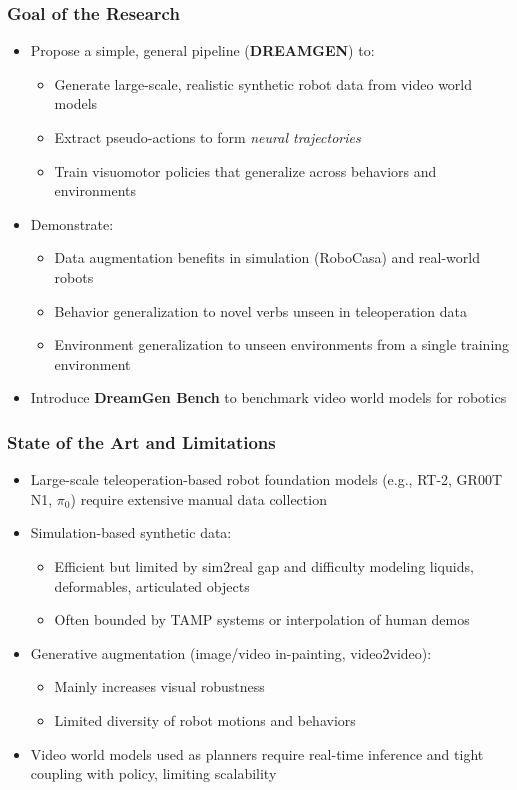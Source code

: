 \documentclass{beamer}
\begin{document}
\begin{frame}
  \frametitle{Goal of the Research}
  \small
  \begin{itemize}
    \item Propose a simple, general pipeline (\textbf{DREAMGEN}) to:
      \begin{itemize}
        \item Generate large-scale, realistic synthetic robot data from video world models
        \item Extract pseudo-actions to form \emph{neural trajectories}
        \item Train visuomotor policies that generalize across behaviors and environments
      \end{itemize}
    \item Demonstrate:
      \begin{itemize}
        \item Data augmentation benefits in simulation (RoboCasa) and real-world robots
        \item Behavior generalization to novel verbs unseen in teleoperation data
        \item Environment generalization to unseen environments from a single training environment
      \end{itemize}
    \item Introduce \textbf{DreamGen Bench} to benchmark video world models for robotics
  \end{itemize}
\end{frame}

\begin{frame}
  \frametitle{State of the Art and Limitations}
  \small
  \begin{itemize}
    \item Large-scale teleoperation-based robot foundation models (e.g., RT-2, GR00T N1, $\pi_0$) require extensive manual data collection
    \item Simulation-based synthetic data:
      \begin{itemize}
        \item Efficient but limited by sim2real gap and difficulty modeling liquids, deformables, articulated objects
        \item Often bounded by TAMP systems or interpolation of human demos
      \end{itemize}
    \item Generative augmentation (image/video in-painting, video2video):
      \begin{itemize}
        \item Mainly increases visual robustness
        \item Limited diversity of robot motions and behaviors
      \end{itemize}
    \item Video world models used as planners require real-time inference and tight coupling with policy, limiting scalability
  \end{itemize}
\end{frame}
\end{document}
